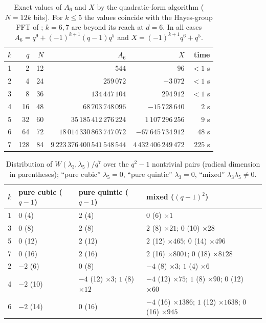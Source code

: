 \documentclass[11pt,a4paper]{amsart}
\theoremstyle{definition}
\begin{document}
\begin{table}[ht]
\centering
\caption{Exact values of $A_6$ and $X$ by the quadratic-form algorithm ($N=12k$ bits). For $k\le5$ the values coincide with the Hayes-group FFT of \cite{Chen}; $k=6,7$ are beyond its reach at $d=6$. In all cases $A_6=q^9+(-1)^{k+1}(q-1)q^5$ and $X=(-1)^{k+1}q^6+q^5$.}\label{tab:A6X}
\begin{tabular}{@{}rrrrrr@{}}
\toprule
$k$ & $q$ & $N$ & $A_6$ & $X$ & time \\
\midrule
1 & 2 & 12 & $544$ & $96$ & $<1$ s\\
2 & 4 & 24 & $259\,072$ & $-3\,072$ & $<1$ s\\
3 & 8 & 36 & $134\,447\,104$ & $294\,912$ & $<1$ s\\
4 & 16 & 48 & $68\,703\,748\,096$ & $-15\,728\,640$ & $2$ s\\
5 & 32 & 60 & $35\,185\,412\,276\,224$ & $1\,107\,296\,256$ & $9$ s\\
6 & 64 & 72 & $18\,014\,330\,863\,747\,072$ & $-67\,645\,734\,912$ & $48$ s\\
7 & 128 & 84 & $9\,223\,376\,400\,541\,548\,544$ & $4\,432\,406\,249\,472$ & $225$ s\\
\bottomrule
\end{tabular}
\end{table}

\begin{table}[ht]
\centering
\caption{Distribution of $W(\lambda_3,\lambda_5)/q^7$ over the $q^2-1$ nontrivial pairs (radical dimension in parentheses); ``pure cubic'' $\lambda_5=0$, ``pure quintic'' $\lambda_3=0$, ``mixed'' $\lambda_3\lambda_5\ne0$.}\label{tab:W}
\begin{tabular}{@{}rlll@{}}
\toprule
$k$ & pure cubic ($q-1$) & pure quintic ($q-1$) & mixed ($(q-1)^2$)\\
\midrule
1 & $0$ (4) & $2$ (4) & $0$ (6) $\times1$\\
3 & $0$ (8) & $2$ (8) & $2$ (8) $\times21$; $0$ (10) $\times28$\\
5 & $0$ (12) & $2$ (12) & $2$ (12) $\times465$; $0$ (14) $\times496$\\
7 & $0$ (16) & $2$ (16) & $2$ (16) $\times8001$; $0$ (18) $\times8128$\\
\midrule
2 & $-2$ (6) & $0$ (8) & $-4$ (8) $\times3$; $1$ (4) $\times6$\\
4 & $-2$ (10) & $-4$ (12) $\times3$; $1$ (8) $\times12$ & $-4$ (12) $\times75$; $1$ (8) $\times90$; $0$ (12) $\times60$\\
6 & $-2$ (14) & $0$ (16) & $-4$ (16) $\times1386$; $1$ (12) $\times1638$; $0$ (16) $\times945$\\
\bottomrule
\end{tabular}
\end{table}
\end{document}

